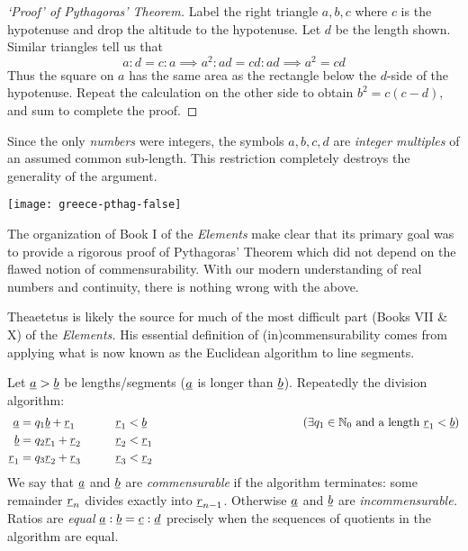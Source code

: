 \begin{minipage}[t]{0.67\linewidth}\vspace{0pt}
\begin{proof}[`Proof' of Pythagoras' Theorem]\label{pg:pythwrong}
Label the right triangle $a,b,c$ where $c$ is the hypotenuse and drop the altitude to the hypotenuse. Let $d$ be the length shown. Similar triangles tell us that
\[a:d=c:a\implies a^2:ad=cd:ad\implies a^2=cd\]
Thus the square on $a$ has the same area as the rectangle below the $d$-side of the hypotenuse. Repeat the calculation on the other side to obtain $b^2=c(c-d)$, and sum to complete the proof.
\end{proof}

Since the only \emph{numbers} were integers, the symbols $a,b,c,d$ are \emph{integer multiples} of an assumed common sub-length. This restriction completely destroys the generality of the argument.
\end{minipage}\hfill\begin{minipage}[t]{0.32\linewidth}\vspace{0pt}
\flushright\texttt{[image: greece-pthag-false]}\label{pthagorig}
\end{minipage}\smallbreak

The organization of Book I of the \emph{Elements} make clear that its primary goal was to provide a rigorous proof of Pythagoras' Theorem which did not depend on the flawed notion of commensurability. With our modern understanding of real numbers and continuity, there is nothing wrong with the above.%




\def\ul{\underline}

Theaetetus is likely the source for much of the most difficult part (Books VII \& X) of the \emph{Elements.} His essential definition of (in)commensurability comes from applying what is now known as the Euclidean algorithm to line segments. 

\begin{defn*}{}{}
Let $\ul a>\ul b$ be lengths/segments\footnotemark{} ($\ul a$ is longer than $\ul b$). Repeatedly the division algorithm: 
	\begin{align*}
	\ul a&=q_1\ul b+\ul r_1\qquad &&\ul r_1<\ul b&&\hspace*{100pt}\tag{$\exists q_1\in\N_0$ and a length $\ul r_1<\ul b$}\\
	\ul b&=q_2\ul r_1+\ul r_2\qquad &&\ul r_2<\ul r_1\\
	\ul r_1&=q_3\ul r_2+\ul r_3\qquad &&\ul r_3<\ul r_2
	\end{align*}
	We say that $\ul a$ and $\ul b$ are \emph{commensurable} if the algorithm terminates: some remainder $\ul r_n$ divides exactly into $\ul r_{n-1}$. Otherwise $\ul a$ and $\ul b$ are \emph{incommensurable.}\smallbreak
	Ratios are \emph{equal} $\ul a:\ul b=\ul c:\ul d$ precisely when the sequences of quotients in the algorithm are equal.
\end{defn*}


